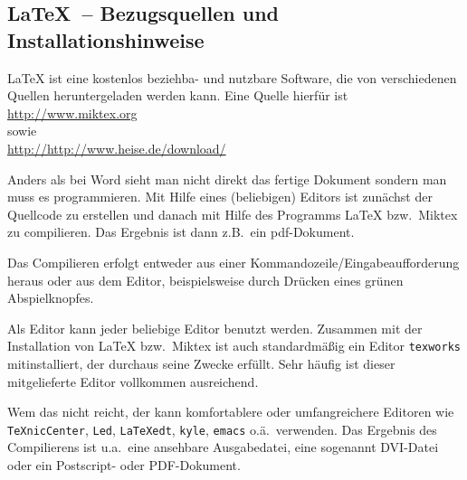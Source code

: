 \subsection{\texorpdfstring{\LaTeX}{LaTeX}\ -- Bezugsquellen und Installationshinweise%
            \label{sec:Grundlagen-LaTeX}}

%
 \LaTeX{} ist eine kostenlos beziehba- und nutzbare Software, die von verschiedenen Quellen heruntergeladen werden kann. 
  Eine Quelle hierfür ist \\
  \url{http://www.miktex.org} \\
  sowie\\
  \url{http://http://www.heise.de/download/} %
 
 Anders als bei Word sieht man nicht direkt das fertige Dokument sondern man muss es \glqq{}programmieren\grqq{}. Mit Hilfe eines (beliebigen) Editors ist zunächst der Quellcode zu erstellen und danach mit Hilfe des Programms \LaTeX{} bzw.~Miktex zu compilieren. Das Ergebnis ist dann z.B.~ein pdf-Dokument. 

Das Compilieren erfolgt entweder aus einer Kommandozeile/Eingabeaufforderung heraus oder aus dem Editor, beispielsweise durch Drücken eines grünen Abspielknopfes. 

Als Editor kann jeder beliebige Editor benutzt werden. Zusammen mit der Installation von \LaTeX{} bzw.~Miktex ist auch standardmäßig ein Editor \texttt{texworks} mitinstalliert, der durchaus seine Zwecke erfüllt. 
  Sehr häufig ist dieser mitgelieferte Editor vollkommen ausreichend. 
  
  Wem das nicht reicht, der kann komfortablere oder umfangreichere Editoren wie \linebreak[4] 
  \texttt{TeXnicCenter}, \texttt{Led}, \texttt{LaTeXedt}, \texttt{kyle}, \texttt{emacs} o.ä.~verwenden. 
Das Ergebnis des Compilierens ist u.a.~eine ansehbare Ausgabedatei, eine sogenannt DVI-Datei oder ein Postscript- oder PDF-Dokument. 



